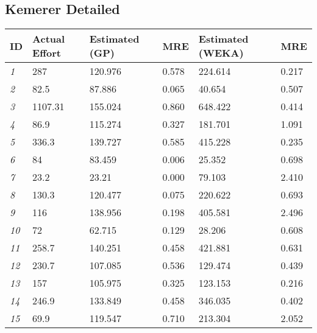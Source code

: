 \documentclass[kemerer.tex]{subfiles}
\begin{document}
	\subsection{Kemerer Detailed} %
	\label{sub:kemerer_detailed}
	\begin{tabularx}{\textwidth}{| X | X || X | X || X | X |}
	\hline
	\textbf{ID} & \textbf{Actual \newline Effort} & \textbf{Estimated (GP)} &
	\textbf{MRE} & \textbf{Estimated (WEKA)} & \textbf{MRE} \\	\hline
	\hline	
	\emph{1} & 287 & 120.976 & 0.578 & 224.614 & 0.217 \\
	\emph{2} & 82.5 & 87.886 & 0.065 & 40.654 & 0.507 \\
	\emph{3} & 1107.31 & 155.024 & 0.860 & 648.422 & 0.414 \\
	\emph{4} & 86.9 & 115.274 & 0.327 & 181.701 & 1.091 \\
	\emph{5} & 336.3 & 139.727 & 0.585 & 415.228 & 0.235 \\
	\emph{6} & 84 & 83.459 & 0.006 & 25.352 & 0.698 \\
	\emph{7} & 23.2 & 23.21 & 0.000 & 79.103 & 2.410 \\
	\emph{8} & 130.3 & 120.477 & 0.075 & 220.622 & 0.693 \\
	\emph{9} & 116 & 138.956 & 0.198 & 405.581 & 2.496 \\
	\emph{10} & 72 & 62.715 & 0.129 & 28.206 & 0.608 \\
	\emph{11} & 258.7 & 140.251 & 0.458 & 421.881 & 0.631 \\
	\emph{12} & 230.7 & 107.085 & 0.536 & 129.474 & 0.439 \\
	\emph{13} & 157 & 105.975 & 0.325 & 123.153 & 0.216 \\
	\emph{14} & 246.9 & 133.849 & 0.458 & 346.035 & 0.402 \\
	\emph{15} & 69.9 & 119.547 & 0.710 & 213.304 & 2.052 \\
	\hline
	\end{tabularx}
\end{document}
